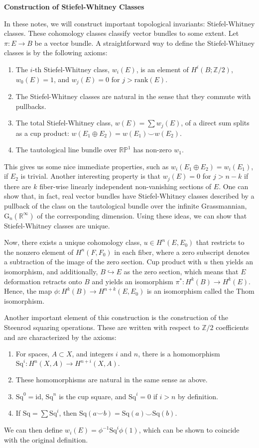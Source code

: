 \documentclass[12pt]{book}
\theoremstyle{definition}
\theoremstyle{remark}
\newcommand{\BR}{\mathbb R}
\newcommand{\BZ}{\mathbb Z}
\newcommand{\Sq}{\mathrm{Sq}}
\newcommand{\rank}{\mathrm{rank}}
\newcommand{\id}{\mathrm{id}}
\newcommand{\s}{\subset}
\begin{document}
\begin{center}
\textbf{\Large Construction of Stiefel-Whitney Classes}
\end{center}

In these notes, we will construct important topological invariants: Stiefel-Whitney classes. These cohomology classes classify vector bundles to some extent. Let $\pi : E \to B$ be a vector bundle. A straightforward way to define the Stiefel-Whitney classes is by the following axioms:
\begin{enumerate}
\item The $i$-th Stiefel-Whitney class, $w_{i}(E)$, is an element of $H^{i}(B;\BZ/2)$, $w_{0}(E) = 1$, and $w_{j}(E) = 0$ for $j > \rank(E).$
\item The Stiefel-Whitney classes are natural in the sense that they commute with pullbacks.
\item The total Stiefel-Whitney class, $w(E) = \sum w_{j}(E)$, of a direct sum splits as a cup product: $w(E_{1} \oplus E_{2}) = w(E_{1}) \smile w(E_{2}).$
\item The tautological line bundle over $\mathbb{RP}^{1}$ has non-zero $w_{1}.$
\end{enumerate}

This gives us some nice immediate properties, such as $w_{i}(E_{1} \oplus E_{2}) = w_{i}(E_{1})$, if $E_{2}$ is trivial. Another interesting property is that $w_{j}(E) = 0$ for $j > n - k$ if there are $k$ fiber-wise linearly independent non-vanishing sections of $E.$ One can show that, in fact, real vector bundles have Stiefel-Whitney classes described by a pullback of the class on the tautological bundle over the infinite Grassmannian, $\mathrm{G}_{n}(\BR^{\infty})$ of the corresponding dimension. Using these ideas, we can show that Stiefel-Whitney classes are unique.

Now, there exists a unique cohomology class, $u \in H^{n}(E,E_{0})$ that restricts to the nonzero element of $H^{n}(F,F_{0})$ in each fiber, where a zero subscript denotes a subtraction of the image of the zero section. Cup product with $u$ then yields an isomorphism, and additionally, $B \hookrightarrow E$ as the zero section, which means that $E$ deformation retracts onto $B$ and yields an isomorphism $\pi^{*} : H^{k}(B) \to H^{k}(E).$ Hence, the map $\phi : H^{k}(B) \to H^{n + k}(E,E_{0})$ is an isomorphism called the Thom isomorphism.

Another important element of this construction is the construction of the Steenrod squaring operations. These are written with respect to $\BZ/2$ coefficients and are characterized by the axioms:
\begin{enumerate}
\item For spaces, $A \s X$, and integers $i$ and $n$, there is a homomorphism $\Sq^{i} : H^{n}(X,A) \to H^{n + i}(X,A).$
\item These homomorphisms are natural in the same sense as above.
\item $\Sq^{0} = \id$, $\Sq^{n}$ is the cup square, and $\Sq^{i} = 0$ if $i > n$ by definition.
\item If $\Sq = \sum \Sq^{i}$, then $\Sq(a \smile b) = \Sq(a) \smile \Sq(b).$
\end{enumerate}

We can then define $w_{i}(E) = \phi^{-1}\Sq^{i}\phi(1)$, which can be shown to coincide with the original definition.
\end{document}
